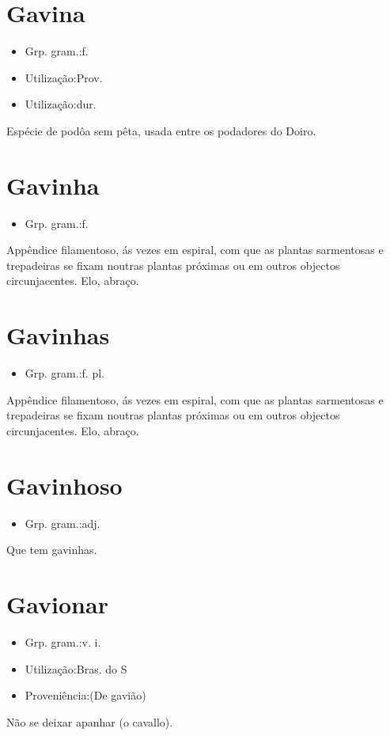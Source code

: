 \section{Gavina}
\begin{itemize}
\item {Grp. gram.:f.}
\end{itemize}
\begin{itemize}
\item {Utilização:Prov.}
\end{itemize}
\begin{itemize}
\item {Utilização:dur.}
\end{itemize}
Espécie de podôa sem pêta, usada entre os podadores do Doiro.
\section{Gavinha}
\begin{itemize}
\item {Grp. gram.:f.}
\end{itemize}
Appêndice filamentoso, ás vezes em espiral, com que as plantas sarmentosas e trepadeiras se fixam noutras plantas próximas ou em outros objectos circunjacentes.
Elo, abraço.
\section{Gavinhas}
\begin{itemize}
\item {Grp. gram.:f. pl.}
\end{itemize}
Appêndice filamentoso, ás vezes em espiral, com que as plantas sarmentosas e trepadeiras se fixam noutras plantas próximas ou em outros objectos circunjacentes.
Elo, abraço.
\section{Gavinhoso}
\begin{itemize}
\item {Grp. gram.:adj.}
\end{itemize}
Que tem gavinhas.
\section{Gavionar}
\begin{itemize}
\item {Grp. gram.:v. i.}
\end{itemize}
\begin{itemize}
\item {Utilização:Bras. do S}
\end{itemize}
\begin{itemize}
\item {Proveniência:(De \textunderscore gavião\textunderscore )}
\end{itemize}
Não se deixar apanhar (o cavallo).

